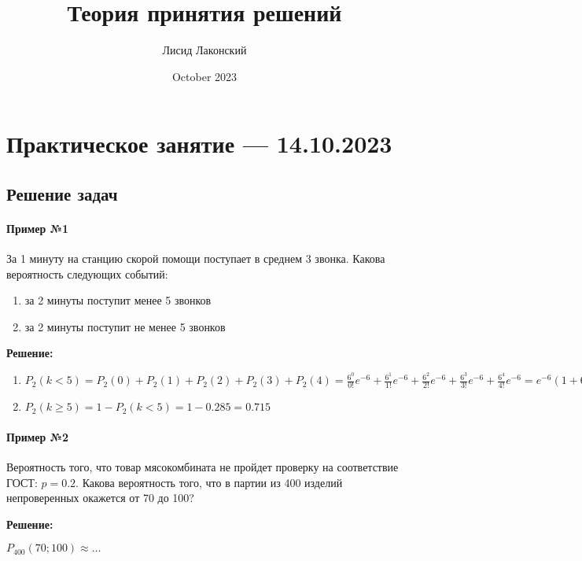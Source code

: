 \documentclass{article}
\title{Теория принятия решений}
\author{Лисид Лаконский}
\date{October 2023}
\begin{document}
\raggedright

\maketitle

\tableofcontents
\pagebreak

\section{Практическое занятие — 14.10.2023}

\subsection{Решение задач}

\paragraph{Пример №1} За 1 минуту на станцию скорой помощи поступает в среднем 3 звонка. Какова вероятность следующих событий:

\begin{enumerate}
    \item за 2 минуты поступит менее 5 звонков
    \item за 2 минуты поступит не менее 5 звонков
\end{enumerate}

\textbf{Решение:}

\begin{enumerate}
    \item $P_{2}(k < 5) = P_{2}(0) + P_2(1) + P_2(2) + P_2(3) + P_2(4) = \frac{6^0}{0!} e^{-6} + \frac{6^1}{1!} e^{-6} + \frac{6^2}{2!} e^{-6} + \frac{6^3}{3!} e^{-6} + \frac{6^4}{4!} e^{-6} = e^{-6} (1 + 6 + 18 + 36 + 54) = \frac{115}{e^6} = 0.285$
    \item $P_2(k \ge 5) = 1 - P_2(k < 5) = 1 - 0.285 = 0.715$
\end{enumerate}

\paragraph{Пример №2} Вероятность того, что товар мясокомбината не пройдет проверку на соответствие ГОСТ: $p = 0.2$. Какова вероятность того, что в партии из 400 изделий непроверенных окажется от 70 до 100?

\textbf{Решение:}

$P_400(70; 100) \approx \dots$
\end{document}
